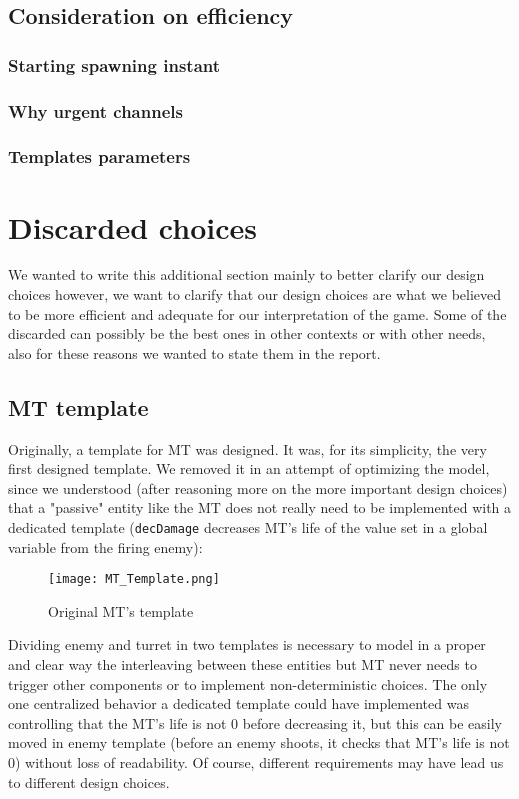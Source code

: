 \documentclass[
10pt, %
a4paper, %
oneside, %
headinclude,footinclude, %
BCOR5mm, %
]{scrartcl}
\begin{document}
\subsection{Consideration on efficiency}
\subsubsection{Starting spawning instant}
\subsubsection{Why urgent channels}
\subsubsection{Templates parameters}

\section{Discarded choices}
We wanted to write this additional section mainly to better clarify our design choices however, we want to clarify that our design choices are what we believed to be more efficient and adequate for our interpretation of the game. Some of the discarded can possibly be the best ones in other contexts or with other needs, also for these reasons we wanted to state them in the report.
\subsection{MT template}
Originally, a template for MT was designed. It was, for its simplicity, the very first designed template. We removed it in an attempt of optimizing the model, since we understood (after reasoning more on the more important design choices) that a "passive" entity like the MT does not really need to be implemented with a dedicated template (\texttt{decDamage} decreases MT's life of the value set in a global variable from the firing enemy):

\begin{figure}[h!]
	\centering
	\texttt{[image: MT\_Template.png]}
	\caption{Original MT's template}
\end{figure}
Dividing enemy and turret in two templates is necessary to model in a proper and clear way the interleaving between these entities but MT never needs to trigger other components or to implement non-deterministic choices. The only one centralized behavior a dedicated template could have implemented was controlling that the MT's life is not 0 before decreasing it, but this can be easily moved in enemy template (before an enemy shoots, it checks that MT's life is not 0) without loss of readability. Of course, different requirements may have lead us to different design choices.
\end{document}
